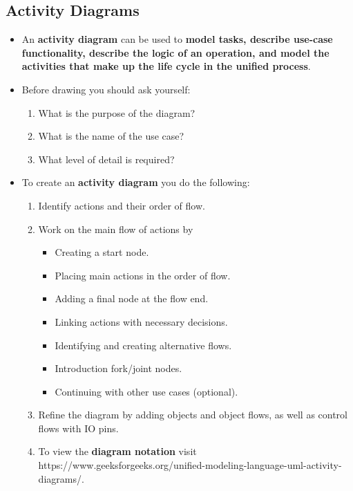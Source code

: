 \documentclass[16pt]{article}
\begin{document}
    \subsection*{Activity Diagrams}
    \begin{itemize}
        \item An \textbf{activity diagram} can be used to \textbf{model tasks, describe use-case functionality, describe the logic of an operation, and model the activities that make up the life cycle in the unified process}.
        \item Before drawing you should ask yourself:
        \begin{enumerate}
            \item What is the purpose of the diagram?
            \item What is the name of the use case?
            \item What level of detail is required?
        \end{enumerate}
        \item To create an \textbf{activity diagram} you do the following:
        \begin{enumerate}
            \item Identify actions and their order of flow.
            \item Work on the main flow of actions by
            \begin{itemize}
                \item Creating a start node.
                \item Placing main actions in the order of flow.
                \item Adding a final node at the flow end.
                \item Linking actions with necessary decisions.
                \item Identifying and creating alternative flows.
                \item Introduction fork/joint nodes.
                \item Continuing with other use cases (optional).
            \end{itemize}
            \item Refine the diagram by adding objects and object flows, as well as control flows with IO pins.
            \item To view the \textbf{diagram notation} visit https://www.geeksforgeeks.org/unified-modeling-language-uml-activity-diagrams/.
        \end{enumerate}
    \end{itemize}
\end{document}
